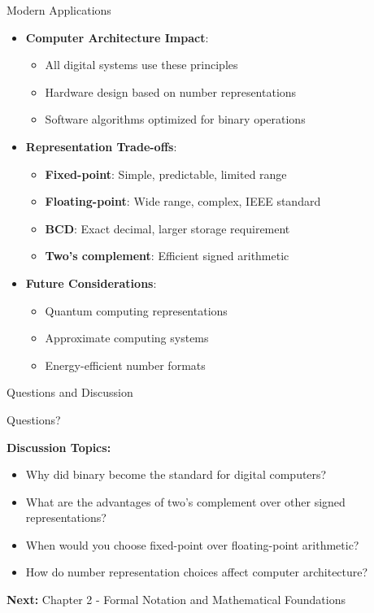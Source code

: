 \documentclass[aspectratio=169,11pt]{beamer}
\newcommand{\concept}[1]{\textbf{\color{accentcolor}#1}}
\begin{document}
\begin{frame}{Modern Applications}
\begin{itemize}
\item \concept{Computer Architecture Impact}:
\begin{itemize}
\item All digital systems use these principles
\item Hardware design based on number representations
\item Software algorithms optimized for binary operations
\end{itemize}
\vspace{0.3cm}
\item \concept{Representation Trade-offs}:
\begin{itemize}
\item \textbf{Fixed-point}: Simple, predictable, limited range
\item \textbf{Floating-point}: Wide range, complex, IEEE standard
\item \textbf{BCD}: Exact decimal, larger storage requirement
\item \textbf{Two's complement}: Efficient signed arithmetic
\end{itemize}
\vspace{0.3cm}
\item \concept{Future Considerations}:
\begin{itemize}
\item Quantum computing representations
\item Approximate computing systems
\item Energy-efficient number formats
\end{itemize}
\end{itemize}
\end{frame}

\begin{frame}{Questions and Discussion}
\begin{center}
\Large
Questions?

\vspace{1cm}

\normalsize
\textbf{Discussion Topics:}
\begin{itemize}
\item Why did binary become the standard for digital computers?
\item What are the advantages of two's complement over other signed representations?
\item When would you choose fixed-point over floating-point arithmetic?
\item How do number representation choices affect computer architecture?
\end{itemize}

\vspace{0.5cm}
\textbf{Next:} Chapter 2 - Formal Notation and Mathematical Foundations
\end{center}
\end{frame}
\end{document}
